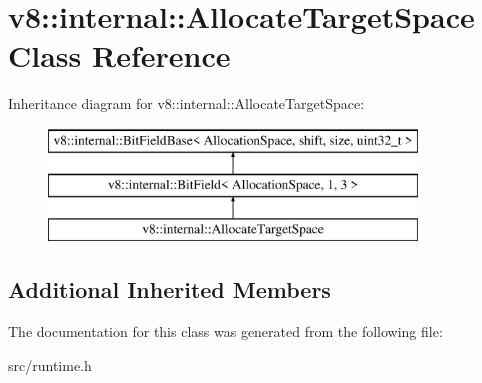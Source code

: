 \hypertarget{classv8_1_1internal_1_1_allocate_target_space}{}\section{v8\+:\+:internal\+:\+:Allocate\+Target\+Space Class Reference}
\label{classv8_1_1internal_1_1_allocate_target_space}
Inheritance diagram for v8\+:\+:internal\+:\+:Allocate\+Target\+Space\+:\begin{figure}[H]
\begin{center}
\leavevmode
\includegraphics[height=3.000000cm]{classv8_1_1internal_1_1_allocate_target_space}
\end{center}
\end{figure}
\subsection*{Additional Inherited Members}


The documentation for this class was generated from the following file\+:\begin{DoxyCompactItemize}
\item 
src/runtime.\+h\end{DoxyCompactItemize}
